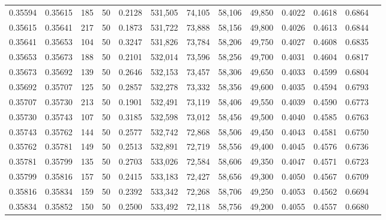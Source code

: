 \begin{tabular}{rrrrrrrrrrrrr}
0.35594 & 0.35615 &   185 &  50 &                                     0.2128 & 531,505 &  74,105 &  58,106 &  49,850 & 0.4022 & 0.4618 & 0.6864 \\
0.35615 & 0.35641 &   217 &  50 &                                     0.1873 & 531,722 &  73,888 &  58,156 &  49,800 & 0.4026 & 0.4613 & 0.6844 \\
0.35641 & 0.35653 &   104 &  50 &                                     0.3247 & 531,826 &  73,784 &  58,206 &  49,750 & 0.4027 & 0.4608 & 0.6835 \\
0.35653 & 0.35673 &   188 &  50 &                                     0.2101 & 532,014 &  73,596 &  58,256 &  49,700 & 0.4031 & 0.4604 & 0.6817 \\
0.35673 & 0.35692 &   139 &  50 &                                     0.2646 & 532,153 &  73,457 &  58,306 &  49,650 & 0.4033 & 0.4599 & 0.6804 \\
0.35692 & 0.35707 &   125 &  50 &                                     0.2857 & 532,278 &  73,332 &  58,356 &  49,600 & 0.4035 & 0.4594 & 0.6793 \\
0.35707 & 0.35730 &   213 &  50 &                                     0.1901 & 532,491 &  73,119 &  58,406 &  49,550 & 0.4039 & 0.4590 & 0.6773 \\
0.35730 & 0.35743 &   107 &  50 &                                     0.3185 & 532,598 &  73,012 &  58,456 &  49,500 & 0.4040 & 0.4585 & 0.6763 \\
0.35743 & 0.35762 &   144 &  50 &                                     0.2577 & 532,742 &  72,868 &  58,506 &  49,450 & 0.4043 & 0.4581 & 0.6750 \\
0.35762 & 0.35781 &   149 &  50 &                                     0.2513 & 532,891 &  72,719 &  58,556 &  49,400 & 0.4045 & 0.4576 & 0.6736 \\
0.35781 & 0.35799 &   135 &  50 &                                     0.2703 & 533,026 &  72,584 &  58,606 &  49,350 & 0.4047 & 0.4571 & 0.6723 \\
0.35799 & 0.35816 &   157 &  50 &                                     0.2415 & 533,183 &  72,427 &  58,656 &  49,300 & 0.4050 & 0.4567 & 0.6709 \\
0.35816 & 0.35834 &   159 &  50 &                                     0.2392 & 533,342 &  72,268 &  58,706 &  49,250 & 0.4053 & 0.4562 & 0.6694 \\
0.35834 & 0.35852 &   150 &  50 &                                     0.2500 & 533,492 &  72,118 &  58,756 &  49,200 & 0.4055 & 0.4557 & 0.6680 \\

\end{tabular}
